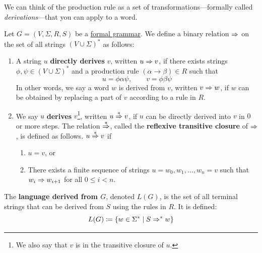   We can think of the production rule as a set of transformations---formally called \textit{derivations}---that you can apply to a word. 

  \begin{definition}[Derivation]
    \label{def:derivation}
    Let $G = (V, \Sigma, R, S)$ be a \hyperref[def:formal-grammar]{formal grammar}. We define a binary relation $\Rightarrow$ on the set of all strings $(V \cup \Sigma)^\ast$ as follows: 
    \begin{enumerate}
      \item A string $u$ \textbf{directly derives} $v$, written $u \Rightarrow v$, if there exists strings $\phi, \psi \in (V \cup \Sigma)^\ast$ and a production rule $(\alpha \to \beta) \in R$ such that 
        \begin{equation}
          u = \phi \alpha \psi, \qquad v = \phi \beta \psi
        \end{equation}
        In other words, we say a word $w$ is derived from $v$, written $v \Rightarrow w$, if $w$ can be obtained by replacing a part of $v$ according to a rule in $R$. 

      \item We say $u$ \textbf{derives} $v$\footnote{We also say that $v$ is in the transitive closure of $u$.}, written $u \overset{\ast}{\Rightarrow} v$, if $u$ can be directly derived into $v$ in $0$ or more steps. The relation $\overset{\ast}{\Rightarrow}$, called the \textbf{reflexive transitive closure} of $\Rightarrow$, is defined as follows. $u \overset{\ast}{\Rightarrow} v$ if 
        \begin{enumerate}
          \item $u = v$, or 
          \item There exists a finite sequence of strings $u = w_0, w_1, \ldots, w_n = v$ such that $w_i \Rightarrow w_{i+1}$ for all $0 \leq i < n$. 
        \end{enumerate}

    \end{enumerate}
  \end{definition}

  \begin{definition}
    \label{def:language-derived-from-grammar}
    The \textbf{language derived from $G$}, denoted $L(G)$, is the set of all terminal strings that can be derived from $S$ using the rules in $R$. It is defined: 
    \begin{equation}
      L(G) \coloneqq \{ w \in \Sigma^\ast \mid S \Rightarrow^\ast w \}
    \end{equation}
  \end{definition}

